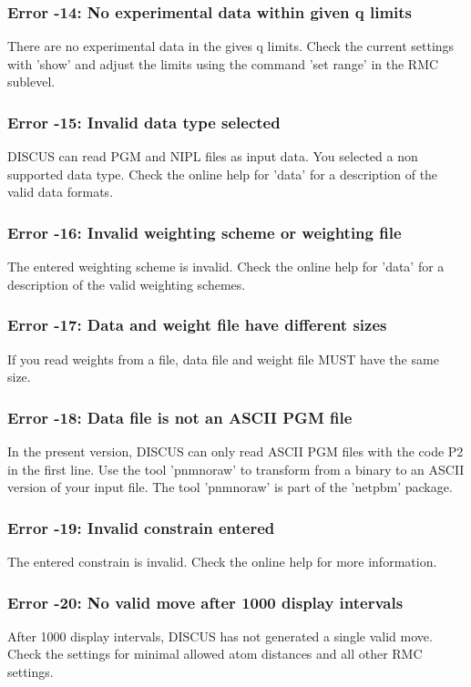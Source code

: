 \subsubsection{Error -14: No experimental data within given q limits}
\par
There are no experimental data in the gives q limits. Check the 
current settings with 'show' and adjust the limits using the 
command 'set range' in the RMC sublevel. 
\subsubsection{Error -15: Invalid data type selected}
\par
DISCUS can read PGM and NIPL files as input data. You selected a 
non supported data type. Check the online help for 'data' for a 
description of the valid data formats. 
\subsubsection{Error -16: Invalid weighting scheme or weighting file}
\par
The entered weighting scheme is invalid. Check the online help for 
'data' for a description of the valid weighting schemes. 
\subsubsection{Error -17: Data and weight file have different sizes}
\par
If you read weights from a file, data file and weight file MUST 
have the same size. 
\subsubsection{Error -18: Data file is not an ASCII PGM file}
\par
In the present version, DISCUS can only read ASCII PGM files with 
the code P2 in the first line. Use the tool 'pnmnoraw' to transform 
from a binary to an ASCII version of your input file. The tool 
'pnmnoraw' is part of the 'netpbm' package. 
\subsubsection{Error -19: Invalid constrain entered}
\par
The entered constrain is invalid. Check the online help for 
more information. 
\subsubsection{Error -20: No valid move after 1000 display intervals}
\par
After 1000 display intervals, DISCUS has not generated a single valid 
move. Check the settings for minimal allowed atom distances and all 
other RMC settings. 
